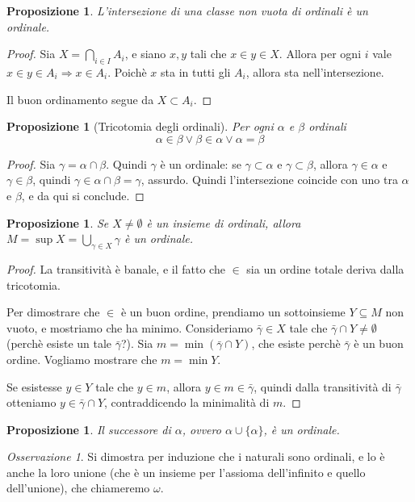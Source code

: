 \documentclass[a4paper,10pt,oneside]{article}
\theoremstyle{plain}
\newtheorem{myprop}[mytheorem]{Proposizione}
\theoremstyle{definition}
\theoremstyle{remark}
\newtheorem*{myobs}{Osservazione}
\begin{document}
\begin{myprop}
L'intersezione di una classe non vuota di ordinali è un ordinale.
\end{myprop}
\begin{proof}
 Sia $X=\bigcap_{i\in I}A_i$, e siano $x,y$ tali che $x\in y \in X$. Allora per ogni $i$ vale $x\in y \in A_i \Rightarrow x\in A_i$. Poichè $x$ sta in tutti gli $A_i$, allora sta nell'intersezione. 
 
 Il buon ordinamento segue da $X\subset A_i$.
\end{proof}
\begin{myprop}[Tricotomia degli ordinali]
 Per ogni $\alpha$ e $\beta$ ordinali \[\alpha \in \beta \vee \beta \in \alpha \vee \alpha=\beta\]
\end{myprop}
\begin{proof}
 Sia $\gamma = \alpha \cap \beta$. Quindi $\gamma$ è un ordinale: se $\gamma \subset \alpha$ e $\gamma \subset \beta$, allora $\gamma \in \alpha$ e $\gamma \in \beta$, quindi $\gamma \in \alpha \cap \beta = \gamma$, assurdo. Quindi l'intersezione coincide con uno tra $\alpha$ e $\beta$, e da qui si conclude.
\end{proof}

\begin{myprop}
 Se $X\ne \emptyset$ è un insieme di ordinali, allora $M = \sup X=\bigcup_{\gamma \in X}\gamma$ è un ordinale.
\end{myprop}
\begin{proof}
 La transitività è banale, e il fatto che $\in$ sia un ordine totale deriva dalla tricotomia.
 
 Per dimostrare che $\in$ è un buon ordine, prendiamo un sottoinsieme $Y \subseteq M$ non vuoto, e mostriamo che ha minimo. Consideriamo $\bar\gamma \in X$ tale che $\bar\gamma \cap Y \ne \emptyset$ (perchè esiste un tale $\bar\gamma$?). Sia $m=\min (\bar\gamma\cap Y)$, che esiste perchè $\bar\gamma$ è un buon ordine. Vogliamo mostrare che $m=\min Y$.
 
 Se esistesse $y\in Y$ tale che $y\in m$, allora $y\in m \in \bar\gamma$, quindi dalla transitività di $\bar\gamma$ otteniamo $y \in \bar\gamma\cap Y$, contraddicendo la minimalità di $m$.
\end{proof}

\begin{myprop}
  Il successore di $\alpha$, ovvero $\alpha \cup \{\alpha\}$, è un ordinale.
\end{myprop}


\begin{myobs}
 Si dimostra per induzione che i naturali sono ordinali, e lo è anche la loro unione (che è un insieme per l'assioma dell'infinito e quello dell'unione), che chiameremo $\omega$.
\end{myobs}
\end{document}
